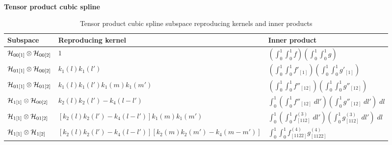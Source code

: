 \begin{example}{\textbf {Tensor product cubic spline}}
\begin{landscape}
\begin{table}[H]
\caption{Tensor product cubic spline subspace reproducing kernels and inner products} %
\centering %
\begin{tabular}{lll} %
\hline\hline %
Subspace 	& 		Reproducing kernel 		& 	Inner product \\
\hline %
$\mathcal{H}_{00\left[1\right]} \otimes \mathcal{H}_{00\left[2\right]}$ & 	$1$								     & 	$\left( \int_0^1 \int_0^1 f \right) \left( \int_0^1 \int_0^1 g \right)$ \\ [1ex] 
$\mathcal{H}_{01\left[1\right]} \otimes \mathcal{H}_{00\left[2\right]} $& 	$k_1\left(l\right)k_1\left(l'\right)$						     & 	$\left( \int_0^1 \int_0^1 f'_{\left[1\right]} \right) \left( \int_0^1 \int_0^1 g'_{\left[1\right]} \right)$ \\ [1ex] 
$\mathcal{H}_{01\left[1\right]} \otimes \mathcal{H}_{01\left[2\right]}$ & 	$k_1\left(l\right)k_1\left(l'\right)k_1\left(m\right)k_1\left(m'\right)$ & $\left( \int_0^1 \int_0^1 f''_{\left[12\right]} \right) \left( \int_0^1 \int_0^1 g''_{\left[12\right]} \right)$ \\ [1ex] 
$\mathcal{H}_{1\left[1\right]} \otimes \mathcal{H}_{00\left[2\right]}$  	& 	$k_2\left(l\right)k_2\left(l'\right) - k_4\left(l - l'\right)$	      & $\int_0^1 \left( \int_0^1 f''_{\left[12\right]}\;dl' \right) \left(  \int_0^1 g''_{\left[12\right]} \;dl'\right)\;dl $\\ [1ex] 
$\mathcal{H}_{1\left[1\right]} \otimes \mathcal{H}_{01\left[2\right]}$ 	& 	$\left[k_2\left(l\right)k_2\left(l'\right) - k_4\left(l - l'\right)\right]k_1\left(m\right)k_1\left(m'\right)$ & $\int_0^1 \left( \int_0^1 f^{\left(3\right)}_{\left[112\right]}\;dl' \right) \left(  \int_0^1 g^{\left(3\right)}_{\left[112\right]} \;dl'\right)\;dl$ \\ [1ex]  
$\mathcal{H}_{1\left[1\right]} \otimes \mathcal{H}_{1\left[2\right]}$  		& $\left[k_2\left(l\right)k_2\left(l'\right) - k_4\left(l - l'\right)\right]\left[k_2\left(m\right)k_2\left(m'\right) - k_4\left(m - m'\right)\right]$ & $\int_0^1  \int_0^1 f^{\left(4\right)}_{\left[1122\right]}g^{\left(4\right)}_{\left[1122\right]}$ \\ [1ex]  
\hline %
\end{tabular}
\label{table:tensor-product-cubic-spline-RK-table}
\end{table}
\end{landscape}
\end{example}

